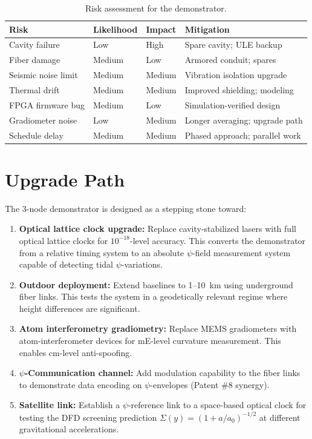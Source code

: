 \documentclass[12pt,letterpaper]{article}
\begin{document}
\begin{table}[h]
\centering
\caption{Risk assessment for the demonstrator.}
\label{tab:risk}
\begin{tabular}{@{}llll@{}}
\toprule
Risk & Likelihood & Impact & Mitigation \\
\midrule
Cavity failure & Low & High & Spare cavity; ULE backup \\
Fiber damage & Medium & Low & Armored conduit; spares \\
Seismic noise limit & Medium & Medium & Vibration isolation upgrade \\
Thermal drift & Medium & Medium & Improved shielding; modeling \\
FPGA firmware bug & Medium & Low & Simulation-verified design \\
Gradiometer noise & Low & Medium & Longer averaging; upgrade path \\
Schedule delay & Medium & Medium & Phased approach; parallel work \\
\bottomrule
\end{tabular}
\end{table}

\section{Upgrade Path}

The 3-node demonstrator is designed as a stepping stone toward:

\begin{enumerate}
\item \textbf{Optical lattice clock upgrade:} Replace cavity-stabilized
lasers with full optical lattice clocks for $10^{-18}$-level accuracy.
This converts the demonstrator from a relative timing system to an
absolute $\psi$-field measurement system capable of detecting tidal
$\psi$-variations.

\item \textbf{Outdoor deployment:} Extend baselines to 1--10~km using
underground fiber links. This tests the system in a geodetically
relevant regime where height differences are significant.

\item \textbf{Atom interferometry gradiometry:} Replace MEMS gradiometers
with atom-interferometer devices for mE-level curvature measurement.
This enables cm-level anti-spoofing.

\item \textbf{$\psi$-Communication channel:} Add modulation capability
to the fiber links to demonstrate data encoding on $\psi$-envelopes
(Patent \#8 synergy).

\item \textbf{Satellite link:} Establish a $\psi$-reference link to
a space-based optical clock for testing the DFD screening prediction
$\Sigma(y) = (1+a/a_0)^{-1/2}$ at different gravitational accelerations.
\end{enumerate}
\end{document}
